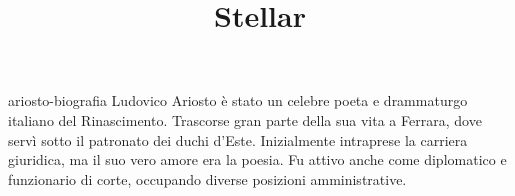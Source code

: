\documentclass[preview]{standalone}
\begin{document}
\title{Stellar}
\genpage

\begin{snippet}{ariosto-biografia}
    Ludovico Ariosto è stato un celebre poeta e drammaturgo italiano del Rinascimento.
    Trascorse gran parte della sua vita a Ferrara, dove servì sotto il patronato
    dei duchi d'Este. Inizialmente intraprese la carriera giuridica,
    ma il suo vero amore era la poesia.
    Fu attivo anche come diplomatico e funzionario di corte,
    occupando diverse posizioni amministrative.
    
\end{snippet}
\end{document}
